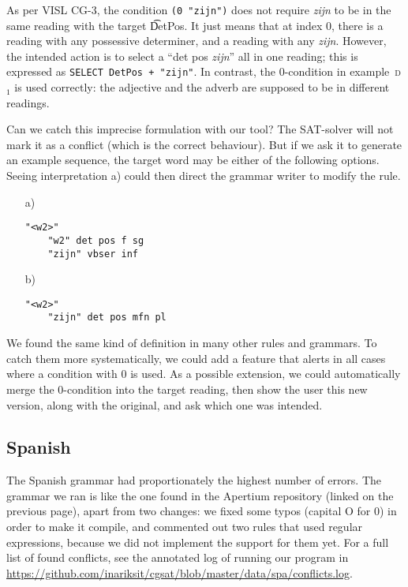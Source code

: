 {{\noindent As per VISL CG-3, the condition \texttt{(0 "zijn")} does not require
 \emph{zijn} to be in the same reading with the target \t{DetPos}.
It just means that at index 0,
there is a reading with any possessive determiner, and a reading with any \emph{zijn}.
However, the intended action is to select a ``det pos \emph{zijn}'' all in one reading;
this is expressed as \texttt{SELECT DetPos + "zijn"}.
In contrast, the 0-condition in example~\textsc{d$_1$} is used correctly:
the adjective and the adverb are supposed to be in different readings.


Can we catch this imprecise formulation with our tool? The SAT-solver will not mark it as a conflict (which is the correct behaviour). But if we ask it to generate an example sequence, the target word may be either of the following options. Seeing interpretation a) could then direct the grammar writer to modify the rule.

\begin{itemize}
\item[a)] \begin{verbatim}
"<w2>"
    "w2" det pos f sg
    "zijn" vbser inf\end{verbatim}

\item[b)] \begin{verbatim}
"<w2>"
    "zijn" det pos mfn pl\end{verbatim}
\end{itemize}


We found the same kind of definition in many other rules and grammars.
To catch them more systematically, we could add a feature that alerts in all cases where a condition with 0 is used. As a possible extension, we could automatically merge the 0-condition into the target reading, then show the user this new version, along with the original, and ask which one was intended.


\subsection{Spanish} The Spanish grammar had proportionately the
highest number of errors. The grammar we ran is like the one
found in the Apertium repository (linked on the previous page), 
apart from two changes: we fixed some typos (capital O for 0) in order to make it compile, and
commented out two rules that used regular expressions, because we did not implement the support for them yet.
For a full list of found conflicts, see the annotated log of running our program in \url{
https://github.com/inariksit/cgsat/blob/master/data/spa/conflicts.log}. 


}}
